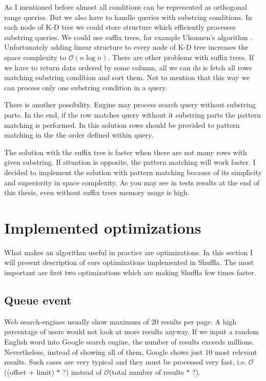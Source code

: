 \documentclass[10pt,a4paper]{article}
\newcommand{\Oh}{\mathcal{O}}
\begin{document}
\bigskip

As I mentioned before almost all conditions can be represented as orthogonal range queries. But we also have to handle queries with substring conditions. In each node of K-D tree we could store structure which efficiently processes substring queries. We could use suffix trees, for example Ukonnen's algorithm \cite{STUKK}. Unfortunately adding linear structure to every node of K-D tree increases the space complexity to $\Oh(n \log n)$. There are other problems with suffix trees. If we have to return data ordered by some column, all we can do is fetch all rows matching substring condition and sort them. Not to mention that this way we can process only one substring condition in a query.

There is another possibility. Engine may process search query without substring parts. In the end, if the row matches query without it substring parts the pattern matching is performed. In this solution rows should be provided to pattern matching in the the order defined within query.

The solution with the suffix tree is faster when there are not many rows with given substring. If situation is opposite, the pattern matching will work faster. I decided to implement the solution with pattern matching because of its simplicity and superiority in space complexity. As you may see in tests results at the end of this thesis, even without suffix trees memory usage is high. 

\section{Implemented optimizations}
\label{chapter:opt}

What makes an algorithm useful in practice are optimizations. In this section I will present description of core optimizations implemented in Shuffla. The most important are first two optimizations which are making Shuffla few times faster.

\subsection{Queue event}
Web search-engines usually show maximum of 20 results per page. A high percentage of users would not look at more results anyway. If we input a random English word into Google search engine, the number of results exceeds millions. Nevertheless, instead of showing all of them, Google shows just 10 most relevant results. Such cases are very typical and they must be processed very fast, i.e. $\Oh$((offset + limit) $*$ ?) instead of $\Oh$(total number of results $*$ ?).
\end{document}
